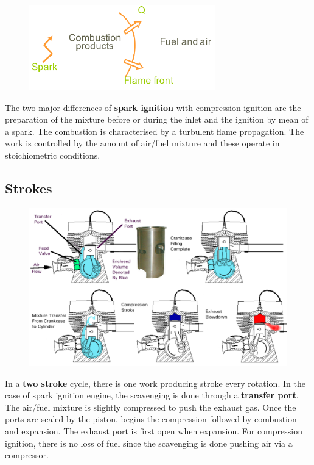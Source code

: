 		\begin{figure}
		\vspace{-15mm}
		\includegraphics[scale=0.74]{ch1/6}
		\label{fig:1.6}
		\end{figure}
		The two major differences of \textbf{spark ignition} with compression ignition are the preparation of the mixture before or during the inlet and the ignition by mean of a spark. The combustion is characterised by a turbulent flame propagation. The work is controlled by the amount of air/fuel mixture and these operate in stoichiometric conditions. 
		
		\newpage
	\subsection{Strokes}
		\begin{figure}
		\vspace{-5mm}
		\includegraphics[scale=0.27]{ch1/7}
		\label{fig:1.7}
		\end{figure}
		In a \textbf{two stroke} cycle, there is one work producing stroke every rotation. In the case of spark ignition engine, the scavenging is done through a \textbf{transfer port}. The air/fuel mixture is slightly compressed to push the exhaust gas. Once the ports are sealed by the piston, begins the compression followed by combustion and expansion. The exhaust port is first open when expansion. For compression ignition, there is no loss of fuel since the scavenging is done pushing air via a compressor.\\
		

